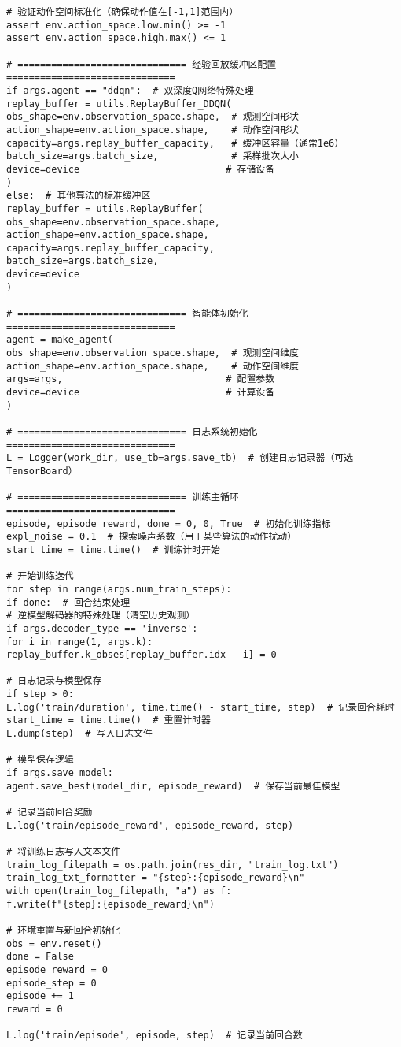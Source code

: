 \begin{lstlisting}
# 验证动作空间标准化（确保动作值在[-1,1]范围内）
assert env.action_space.low.min() >= -1
assert env.action_space.high.max() <= 1

# ============================== 经验回放缓冲区配置 ==============================
if args.agent == "ddqn":  # 双深度Q网络特殊处理
replay_buffer = utils.ReplayBuffer_DDQN(
obs_shape=env.observation_space.shape,  # 观测空间形状
action_shape=env.action_space.shape,    # 动作空间形状
capacity=args.replay_buffer_capacity,   # 缓冲区容量（通常1e6）
batch_size=args.batch_size,             # 采样批次大小
device=device                          # 存储设备
)
else:  # 其他算法的标准缓冲区
replay_buffer = utils.ReplayBuffer(
obs_shape=env.observation_space.shape,
action_shape=env.action_space.shape,
capacity=args.replay_buffer_capacity,
batch_size=args.batch_size,
device=device
)

# ============================== 智能体初始化 ==============================
agent = make_agent(
obs_shape=env.observation_space.shape,  # 观测空间维度
action_shape=env.action_space.shape,    # 动作空间维度
args=args,                             # 配置参数
device=device                          # 计算设备
)

# ============================== 日志系统初始化 ==============================
L = Logger(work_dir, use_tb=args.save_tb)  # 创建日志记录器（可选TensorBoard）

# ============================== 训练主循环 ==============================
episode, episode_reward, done = 0, 0, True  # 初始化训练指标
expl_noise = 0.1  # 探索噪声系数（用于某些算法的动作扰动）
start_time = time.time()  # 训练计时开始

# 开始训练迭代
for step in range(args.num_train_steps):
if done:  # 回合结束处理
# 逆模型解码器的特殊处理（清空历史观测）
if args.decoder_type == 'inverse':
for i in range(1, args.k):
replay_buffer.k_obses[replay_buffer.idx - i] = 0

# 日志记录与模型保存
if step > 0:
L.log('train/duration', time.time() - start_time, step)  # 记录回合耗时
start_time = time.time()  # 重置计时器
L.dump(step)  # 写入日志文件

# 模型保存逻辑
if args.save_model:
agent.save_best(model_dir, episode_reward)  # 保存当前最佳模型

# 记录当前回合奖励
L.log('train/episode_reward', episode_reward, step)

# 将训练日志写入文本文件
train_log_filepath = os.path.join(res_dir, "train_log.txt")
train_log_txt_formatter = "{step}:{episode_reward}\n"
with open(train_log_filepath, "a") as f:
f.write(f"{step}:{episode_reward}\n")

# 环境重置与新回合初始化
obs = env.reset()
done = False
episode_reward = 0
episode_step = 0
episode += 1
reward = 0

L.log('train/episode', episode, step)  # 记录当前回合数
\end{lstlisting}
	

